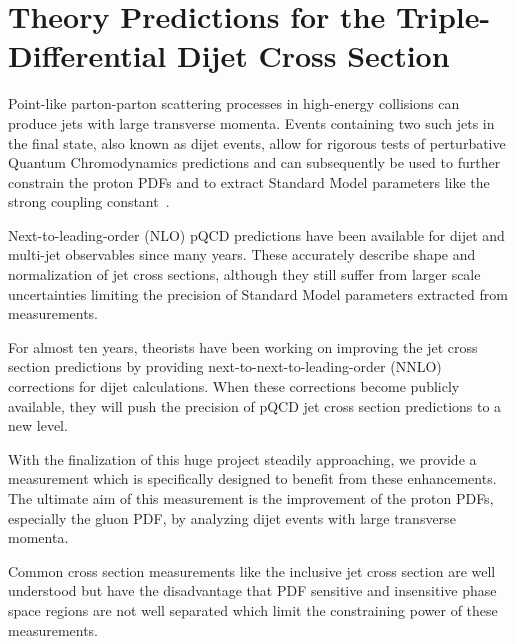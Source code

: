 
\chapter{Theory Predictions for the Triple-Differential Dijet Cross Section}
\label{sec:theory_predictions}

Point-like parton-parton scattering processes in high-energy collisions can
produce jets with large transverse momenta. Events containing two such jets in
the final state, also known as dijet events, allow for rigorous tests of
perturbative Quantum Chromodynamics predictions and can subsequently be used to
further constrain the proton PDFs and to extract Standard Model parameters like the
strong coupling constant~\as.

Next-to-leading-order (NLO) pQCD predictions have been available for dijet and
multi-jet observables since many years. These accurately describe shape and
normalization of jet cross sections, although they still suffer from larger
scale uncertainties limiting the precision of Standard Model parameters
extracted from measurements.

For almost ten years, theorists have been working on improving the jet cross
section predictions by providing next-to-next-to-leading-order (NNLO)
corrections for dijet calculations. When these corrections become publicly
available, they will push the precision of pQCD jet cross section predictions to
a new level.

With the finalization of this huge project steadily approaching, we provide a
measurement which is specifically designed to benefit from these enhancements.
The ultimate aim of this measurement is the improvement of the proton PDFs,
especially the gluon PDF, by analyzing dijet events with large transverse
momenta.

Common cross section measurements like the inclusive jet cross section are well
understood but have the disadvantage that PDF sensitive and insensitive phase
space regions are not well separated which limit the constraining power of these
measurements.

